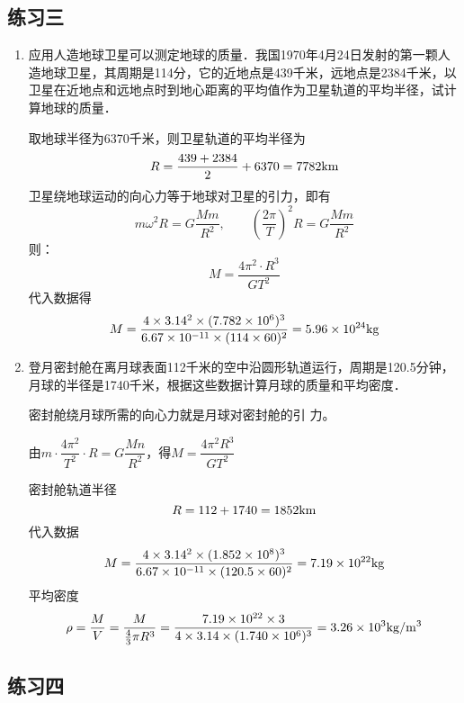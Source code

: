 \subsection{练习三}
\begin{enumerate}
	\item 应用人造地球卫星可以测定地球的质量．我国1970年4月24日发射的第一颗人造地球卫星，其周期是114分，它的近地点是439千米，远地点是2384千米，以卫星在近地点和远地点时到地心距离的平均值作为卫星轨道的平均半径，试计算地球的质量．

	\begin{solution}
		取地球半径为6370千米，则卫星轨道的平均半径为		
	\[R=\frac{439+2384}{2}+6370=7782{\rm km}\]
		卫星绕地球运动的向心力等于地球对卫星的引力，即有
\[m\omega^2 R=G\frac{Mm}{R^2},\qquad \left(\frac{2\pi}{T}\right)^2 R=G\frac{Mm}{R^2}\]
则：
\[M=\frac{4\pi^2\cdot R^3}{GT^2}\]
代入数据得
\[M=\frac{4\times 3.14^2\times (7.782\times 10^6)^3}{6.67\times 10^{-11}\times (114\times 60)^2}=5.96\times 10^{24}{\rm kg}\]
	\end{solution}
	
	\item 登月密封舱在离月球表面112千米的空中沿圆形轨道运行，周期是120.5分钟，月球的半径是1740千米，根据这些数据计算月球的质量和平均密度．

	\begin{solution}
密封舱绕月球所需的向心力就是月球对密封舱的引
力。

由$m\cdot \dfrac{4\pi^2}{T^2}\cdot R=G\dfrac{Mn}{R^2}$，得$M=\dfrac{4\pi^2 R^3}{GT^2}$

密封舱轨道半径
\[R=112+1740=1852{\rm km}\]
代入数据
\[M=\frac{4\times3.14^2\times(1.852\times10^8)^3}{6.67\times10^{-11}\times(120.5\times60)^2}
=7.19\times10^{22}{\rm kg}\]
平均密度
\[\rho=\frac{M}{V}=\frac{M}{\frac{4}{3}\pi R^3}=\frac{7.19\times 10^{22}\times 3}{4\times 3.14\times (1.740\times 10^{6})^3}=3.26\times 10^{3}{\rm kg/m^3}\]
	\end{solution}
	
\end{enumerate}


\subsection{练习四}


